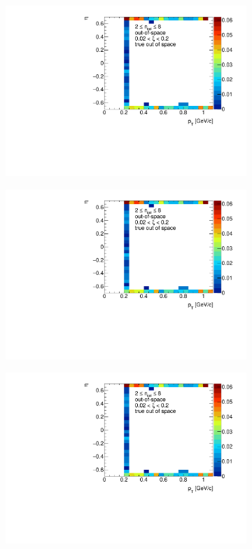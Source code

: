 \begin{figure}[h!]
	\centering
	\begin{subfigure}{.45\textwidth}
		\includegraphics[width=\textwidth,page=1]{chapters/chrgSTAR/img/OKR/outOfSpace.pdf}
	\end{subfigure}
	\begin{subfigure}{.45\textwidth}
		\includegraphics[width=\textwidth,page=2]{chapters/chrgSTAR/img/OKR/outOfSpace.pdf}
	\end{subfigure}
	\begin{subfigure}{.45\textwidth}
		\includegraphics[width=\textwidth,page=3]{chapters/chrgSTAR/img/OKR/outOfSpace.pdf}

\end{subfigure}
\end{figure}

